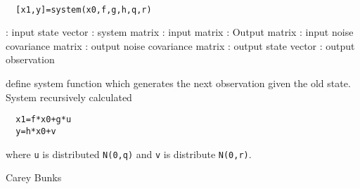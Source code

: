 
\begin{mandesc}
   \\ %
\end{mandesc}
\begin{calling_sequence}
\begin{verbatim}
  [x1,y]=system(x0,f,g,h,q,r)  
\end{verbatim}
\end{calling_sequence}
\begin{parameters}
  \begin{varlist}
    : input state vector
    : system matrix
    : input matrix
    : Output matrix
    : input noise covariance matrix
    : output noise covariance matrix
    : output state vector
    : output observation
  \end{varlist}
\end{parameters}
\begin{mandescription}
  define system function which generates the next
  observation given the old state.
  System recursively calculated
\begin{verbatim}
  x1=f*x0+g*u
  y=h*x0+v
\end{verbatim}
where \verb!u! is distributed \verb!N(0,q)!
and \verb!v! is distribute \verb!N(0,r)!.
\end{mandescription}
\begin{authors}
  Carey Bunks
\end{authors}
